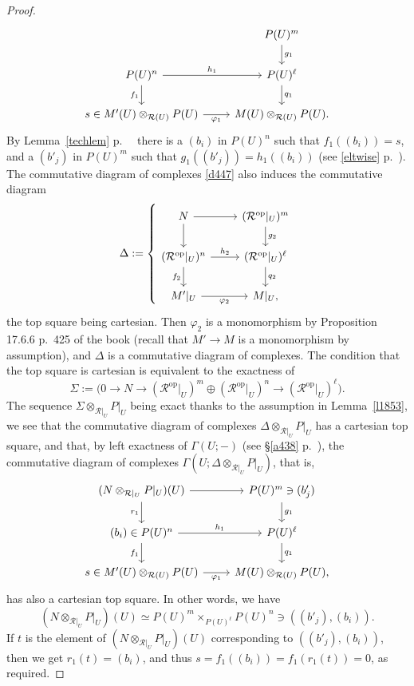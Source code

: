 \documentclass[12pt]{article}%
\theoremstyle{remark}
\theoremstyle{definition}
\newcommand{\cc}{\mathcal}
\DeclareMathOperator{\op}{op}
\begin{document}
\begin{proof}
$$
\begin{tikzcd}
{}&P(U)^m\ar{d}{g_1}\\ 
P(U)^n\ar{r}{h_1}\ar{d}[swap]{f_1}&P(U)^\ell\ar{d}{q_1}\\ 
s\in M'(U)\otimes_{\cc R(U)}P(U)\ar{r}[swap]{\varphi_1}&M(U)\otimes_{\cc R(U)}P(U).
\end{tikzcd}
$$ 
By Lemma~\ref{techlem} p.~~\pageref{techlem} there is a $(b_i)$ in $P(U)^n$ such that $f_1((b_i))=s$, and a $(b'_j)$ in $P(U)^m$ such that $g_1((b'_j))=h_1((b_i))$ (see \eqref{eltwise} p.~\pageref{eltwise}). The commutative diagram of complexes \eqref{d447} also induces the commutative diagram 
$$
\Delta:=\left\{
\begin{tikzcd}
N\ar{r}\ar{d}&(\cc R^{\op}|_U)^m\ar{d}{g_2}\\ 
(\cc R^{\op}|_U)^n\ar{r}{h_2}\ar{d}[swap]{f_2}&(\cc R^{\op}|_U)^\ell\ar{d}{q_2}\\ 
M'|_U\ar{r}[swap]{\varphi_2}&M|_U,
\end{tikzcd}
\right.
$$
the top square being cartesian. Then $\varphi_2$ is a monomorphism by Proposition 17.6.6 p.~425 of the book (recall that $M'\to M$ is a monomorphism by assumption), and $\Delta$ is a commutative diagram of complexes. The condition that the top square is cartesian is equivalent to the exactness of 
%
\begin{equation}\label{tsc2}
\Sigma:=\Big(0\to N\to(\cc R^{\op}|_U)^m\oplus(\cc R^{\op}|_U)^n\to(\cc R^{\op}|_U)^\ell\Big).
\end{equation}
% 
The sequence $\Sigma\otimes_{\cc R|_U}P|_U$ being exact thanks to the assumption in Lemma~\ref{l1853}, we see that the commutative diagram of complexes $\Delta\otimes_{\cc R|_U}P|_U$ has a cartesian top square, and that, by left exactness of $\Gamma(U;-)$ (see \S\ref{a438} p.~\pageref{a438}), the commutative diagram of complexes $\Gamma(U;\Delta\otimes_{\cc R|_U}P|_U)$, that is, 
$$
\begin{tikzcd}
(N\otimes_{\cc R|_U}P|_U)(U)\ar{r}\ar{d}[swap]{r_1}&P(U)^m\ar{d}{g_1}\ni(b'_j)\\ 
(b_i)\in P(U)^n\ar{r}{h_1}\ar{d}[swap]{f_1}&P(U)^\ell\ar{d}{q_1}\\ 
s\in M'(U)\otimes_{\cc R(U)}P(U)\ar{r}[swap]{\varphi_1}&M(U)\otimes_{\cc R(U)}P(U),
\end{tikzcd}
$$ 
has also a cartesian top square. In other words, we have 
$$
(N\otimes_{\cc R|_U}P|_U)(U)\simeq P(U)^m\times_{P(U)^\ell}P(U)^n\ni((b'_j),(b_i)).
$$ 
If $t$ is the element of $(N\otimes_{\cc R|_U}P|_U)(U)$ corresponding to $((b'_j),(b_i))$, then we get $r_1(t)=(b_i)$, and thus $s=f_1((b_i))=f_1(r_1(t))=0$, as required.
\end{proof}
\end{document}
